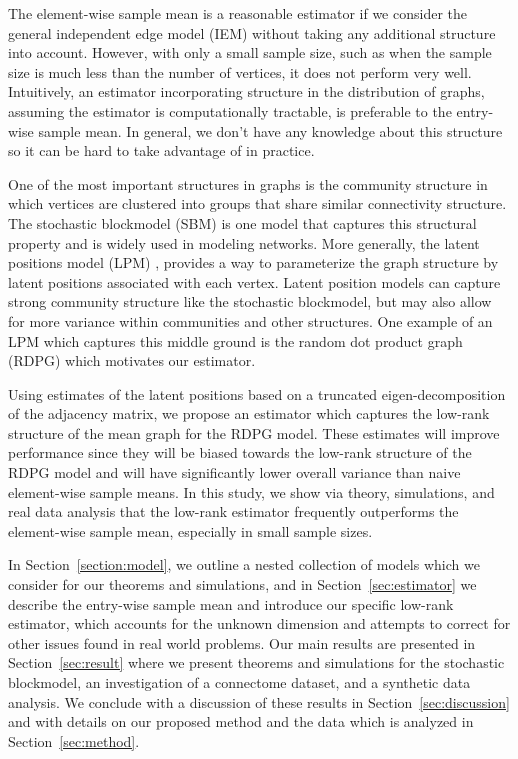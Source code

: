 \documentclass[10pt,letterpaper]{article}
\begin{document}
The element-wise sample mean is a reasonable estimator if we consider the general independent edge model (IEM) \citep{bollobas2007phase} without taking any additional structure into account. 
However, with only a small sample size, such as when the sample size is much less than the number of vertices, it does not perform very well.
Intuitively, an estimator incorporating structure in the distribution of graphs, assuming the estimator is computationally tractable, is preferable to the entry-wise sample mean. 
In general, we don't have any knowledge about this structure so it can be hard to take advantage of in practice.



One of the most important structures in graphs is the community structure in which vertices are clustered into groups that share similar connectivity structure. The stochastic blockmodel (SBM) \citep{holland1983stochastic} is one model that captures this structural property and is widely used in modeling networks.
More generally, the latent positions model (LPM) \citep{hoff2002latent}, provides a way to parameterize the graph structure by latent positions associated with each vertex. 
Latent position models can capture strong community structure like the stochastic blockmodel, but may also allow for more variance within communities and other structures.
One example of an LPM which captures this middle ground is the random dot product graph (RDPG) \citep{young2007random, nickel2007random} which motivates our estimator. 

Using estimates of the latent positions based on a truncated eigen-decomposition of the adjacency matrix, we propose an estimator which captures the low-rank structure of the mean graph for the RDPG model.
These estimates will improve performance since they will be biased towards the low-rank structure of the RDPG model and will have significantly lower overall variance than naive element-wise sample means.
In this study, we show via theory, simulations, and real data analysis that the low-rank estimator frequently outperforms the element-wise sample mean, especially in small sample sizes.


In Section~\ref{section:model}, we outline a nested collection of models which we consider for our theorems and simulations, and in Section~\ref{sec:estimator} we describe the entry-wise sample mean and introduce our specific low-rank estimator, which accounts for the unknown dimension and attempts to correct for other issues found in real world problems.
Our main results are presented in Section~\ref{sec:result} where we present theorems and simulations for the stochastic blockmodel, an investigation of a connectome dataset, and a synthetic data analysis. 
We conclude with a discussion of these results in Section~\ref{sec:discussion}  and with details on our proposed method and the data which is analyzed in Section~\ref{sec:method}.
\end{document}
